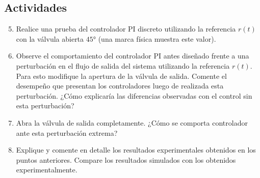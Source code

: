 \documentclass[11pt,letterpaper,notitlepage]{article}
\begin{document}
\subsection{Actividades}
\begin{enumerate}[\bfseries {A}1]
\setcounter{enumi}{4}

\item Realice una prueba del controlador PI discreto utilizando la referencia $r(t)$ con la válvula abierta $45\si{\degree}$ (una marca física muestra este valor).

\item Observe el comportamiento del controlador PI antes diseñado frente a una perturbación en el flujo de salida del sistema utilizando la referencia $r(t)$. Para esto modifique la apertura de la válvula de salida. Comente el desempeño que presentan los controladores luego de realizada esta perturbación. ¿Cómo explicaría las diferencias observadas con el control sin esta perturbación?

\item Abra la válvula de salida completamente. ¿Cómo se comporta controlador ante esta perturbación extrema?

\item Explique y comente en detalle los resultados experimentales obtenidos en los puntos anteriores. Compare los resultados simulados con los obtenidos experimentalmente.

\end{enumerate}
\end{document}
